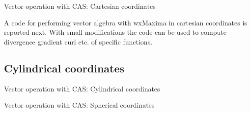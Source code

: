\documentclass[handout,10pt]{beamer}
\begin{document}
\begin{frame}[shrink=00]{Vector operation with CAS: Cartesian coordinates}
 
  
A code for performing vector algebra with wxMaxima in cartesian coordinates is reported next.
 With small modifications the code can be used to compute divergence gradient curl etc. of specific functions.

\small

\normalsize
\newpage

\subsection{Cylindrical coordinates} 

\small

\normalsize
\newpage


\end{frame}

\begin{frame}[shrink=00]{Vector operation with CAS: Cylindrical coordinates}

\small

\normalsize
\newpage

\end{frame}


\begin{frame}[shrink=00]{Vector operation with CAS: Spherical coordinates}


\small

\normalsize
\newpage

\end{frame}
\end{document}
